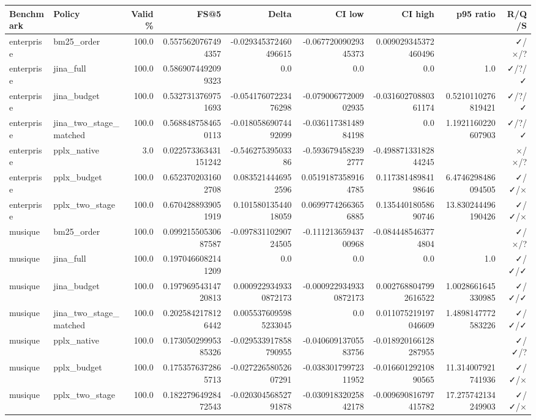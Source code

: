 \begin{tabular}{llrrrrrrr}
Benchmark & Policy & Valid\% & FS@5 & Delta & CI low & CI high & p95 ratio & R/Q/S \\ \hline
enterprise & bm25_order & 100.0 & 0.5575620767494357 & -0.029345372460496615 & -0.06772009029345373 & 0.009029345372460496 &  & ✓/×/? \\ 
enterprise & jina_full & 100.0 & 0.5869074492099323 & 0.0 & 0.0 & 0.0 & 1.0 & ✓/?/✓ \\ 
enterprise & jina_budget & 100.0 & 0.5327313769751693 & -0.05417607223476298 & -0.07900677200902935 & -0.03160270880361174 & 0.5210110276819421 & ✓/?/✓ \\ 
enterprise & jina_two_stage_matched & 100.0 & 0.5688487584650113 & -0.01805869074492099 & -0.03611738148984198 & 0.0 & 1.1921160220607903 & ✓/?/✓ \\ 
enterprise & pplx_native & 3.0 & 0.022573363431151242 & -0.54627539503386 & -0.5936794582392777 & -0.49887133182844245 &  & ×/×/? \\ 
enterprise & pplx_budget & 100.0 & 0.6523702031602708 & 0.0835214446952596 & 0.05191873589164785 & 0.11738148984198646 & 6.4746298486094505 & ✓/✓/× \\ 
enterprise & pplx_two_stage & 100.0 & 0.6704288939051919 & 0.10158013544018059 & 0.06997742663656885 & 0.13544018058690746 & 13.830244496190426 & ✓/✓/× \\ 
musique & bm25_order & 100.0 & 0.09921550530687587 & -0.09783110290724505 & -0.11121365943700968 & -0.0844485463774804 &  & ✓/×/? \\ 
musique & jina_full & 100.0 & 0.1970466082141209 & 0.0 & 0.0 & 0.0 & 1.0 & ✓/✓/✓ \\ 
musique & jina_budget & 100.0 & 0.19796954314720813 & 0.0009229349330872173 & -0.0009229349330872173 & 0.0027688047992616522 & 1.0028661645330985 & ✓/✓/✓ \\ 
musique & jina_two_stage_matched & 100.0 & 0.2025842178126442 & 0.0055376095985233045 & 0.0 & 0.011075219197046609 & 1.4898147772583226 & ✓/✓/✓ \\ 
musique & pplx_native & 100.0 & 0.17305029995385326 & -0.029533917858790955 & -0.04060913705583756 & -0.018920166128287955 &  & ✓/✓/? \\ 
musique & pplx_budget & 100.0 & 0.1753576372865713 & -0.02722658052607291 & -0.03830179972311952 & -0.01660129210890565 & 11.314007921741936 & ✓/✓/× \\ 
musique & pplx_two_stage & 100.0 & 0.18227964928472543 & -0.02030456852791878 & -0.03091832025842178 & -0.009690816797415782 & 17.275742134249903 & ✓/✓/× \\ 
\end{tabular}
